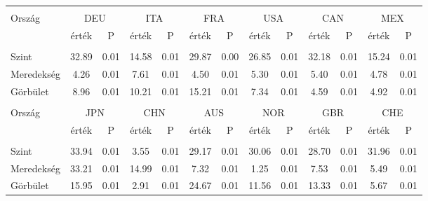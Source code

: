 \documentclass[12pt,bibliography=totoc]{article}
\begin{document}
\begin{table}
\begin{subtable}[t]{1\textwidth}
\centering%
\begin{tabular}{l cc cc cc cc cc cc}%
\hline\hline \\ [-1.5ex]                         %

Ország	&	\multicolumn{2}{c}{DEU}			&	\multicolumn{2}{c}{ITA}			&	\multicolumn{2}{c}{FRA}			&	\multicolumn{2}{c}{USA}			&	\multicolumn{2}{c}{CAN}			&	\multicolumn{2}{c}{MEX}			\\[0.5ex] 

 & érték &P & érték &P& érték &P & érték &P& érték &P & érték &P\\

\hline       \\ [-1.5ex] 

Szint	&	32.89	&	0.01	&	14.58	&	0.01	&	29.87	&	0.00	&	26.85	&	0.01	&	32.18	&	0.01	&	15.24	&	0.01	\\
Meredekség	&	4.26	&	0.01	&	7.61	&	0.01	&	4.50	&	0.01	&	5.30	&	0.01	&	5.40	&	0.01	&	4.78	&	0.01	\\
\medskip
Görbület	&	8.96	&	0.01	&	10.21	&	0.01	&	15.21	&	0.01	&	7.34	&	0.01	&	4.59	&	0.01	&	4.92	&	0.01	\\


\hline   \\ [-1.5ex]    

Ország	&	\multicolumn{2}{c}{JPN}			&	\multicolumn{2}{c}{CHN}			&	\multicolumn{2}{c}{AUS}			&	\multicolumn{2}{c}{NOR}			&	\multicolumn{2}{c}{GBR}			&	\multicolumn{2}{c}{CHE}			\\

 & érték &P & érték &P& érték &P & érték &P& érték &P & érték &P\\

\hline       \\ [-1.5ex] 

Szint	&	33.94	&	0.01	&	3.55	&	0.01	&	29.17	&	0.01	&	30.06	&	0.01	&	28.70	&	0.01	&	31.96	&	0.01	\\
Meredekség	&	33.21	&	0.01	&	14.99	&	0.01	&	7.32	&	0.01	&	1.25	&	0.01	&	7.53	&	0.01	&	5.49	&	0.01	\\
\medskip
Görbület	&	15.95	&	0.01	&	2.91	&	0.01	&	24.67	&	0.01	&	11.56	&	0.01	&	13.33	&	0.01	&	5.67	&	0.01	\\



\end{tabular}
\end{subtable}
\end{table}
\end{document}
